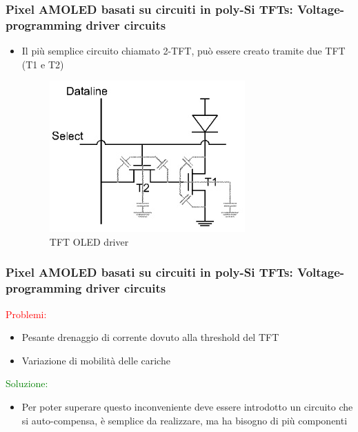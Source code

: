 \documentclass[12pt]{beamer}
\begin{document}
	\begin{frame}
		\frametitle{Pixel AMOLED basati su circuiti in poly-Si TFTs: Voltage-programming driver circuits}
		\begin{itemize}
			\item Il più semplice circuito chiamato 2-TFT, può essere creato tramite due TFT (T1 e T2)
			\pause
			\begin{figure}
				\centering
				\includegraphics[width=0.7\linewidth]{FISICA/tft_oled_driver}
				\caption{TFT OLED driver}
				\label{fig:tftoleddriver}
			\end{figure}
		\end{itemize}
	\end{frame}
	\begin{frame}
		\frametitle{Pixel AMOLED basati su circuiti in poly-Si TFTs: Voltage-programming driver circuits}
		\textcolor{red}{Problemi:}
		\begin{itemize}
			\item Pesante drenaggio di corrente dovuto alla threshold del TFT
			\item Variazione di mobilità delle cariche
		\end{itemize}
		\pause
		\textcolor{green}{Soluzione:}
		\pause
		\begin{itemize}
			\item Per poter superare questo inconveniente deve essere introdotto un circuito che si auto-compensa, è semplice da realizzare, ma ha bisogno di più componenti
		\end{itemize}
	\end{frame}
\end{document}
